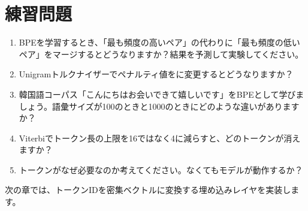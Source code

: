 \section{練習問題}

\begin{enumerate}
\item BPEを学習するとき、「最も頻度の高いペア」の代わりに「最も頻度の低いペア」をマージするとどうなりますか？結果を予測して実験してください。
\item Unigramトルクナイザーでペナルティ値をに変更するとどうなりますか？
\item 韓国語コーパス「こんにちはお会いできて嬉しいです」をBPEとして学びましょう。語彙サイズが100のときと1000のときにどのような違いがありますか？
\item Viterbiでトークン長の上限を16ではなく4に減らすと、どのトークンが消えますか？
\item{}トークンがなぜ必要なのか考えてください。なくてもモデルが動作するか？
\end{enumerate}

次の章では、トークンIDを密集ベクトルに変換する埋め込みレイヤを実装します。
